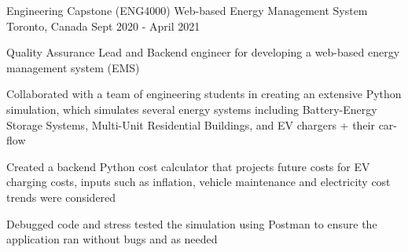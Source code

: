 \begin{cventries}
\cventry
{Engineering Capstone (ENG4000)} %
{Web-based Energy Management System} %
{Toronto, Canada} %
{Sept 2020 - April 2021} %
{ %
\begin{cvitems}
\item {Quality Assurance Lead and Backend engineer for developing a web-based energy management system (EMS)}
\item {Collaborated with a team of engineering students in creating an extensive Python simulation, which simulates several energy systems including Battery-Energy Storage Systems, Multi-Unit Residential Buildings, and EV chargers + their car-flow}
\item {Created a backend Python cost calculator that projects future costs for EV charging costs, inputs such as inflation, vehicle maintenance and electricity cost trends were considered}
\item {Debugged code and stress tested the simulation using Postman to ensure the application ran without bugs and as needed}
\end{cvitems}
}


\end{cventries}
